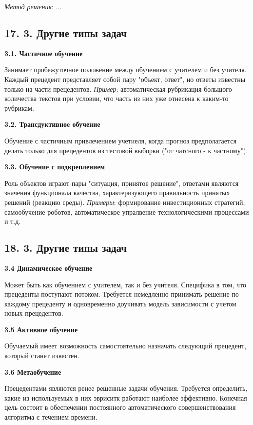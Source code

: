 \textit{Метод решения}: ...

\subsection{17. 3. Другие типы задач}

\textbf{3.1. Частичное обучение}

Занимает пробежуточное положение между обучением с учителем и без учителя.
Каждый прецедент представляет собой пару "объект, ответ", но ответы
известны только на части прецедентов.
\textit{Пример}: автоматическая рубрикация большого количества текстов при условии,
что часть из них уже отнесена к каким-то рубрикам.

\textbf{3.2. Трансдуктивное обучение}

Обучение с частичным привлечением учетиеля, когда прогноз предполагается
делать только для прецедентов из тестовой выборки ("от чатсного - 
к частному").

\textbf{3.3. Обучение с подкреплением}

Роль объектов играют пары "ситуация, принятое решение", ответами являются
значения функционала качества, характеризующего правильность принятых
решений (реакцию среды).
\textit{Примеры}: формирование инвестиционных стратегий, самообучение роботов,
автоматическое упралвение технологическими процессами и т.д.

\subsection{18. 3. Другие типы задач}

\textbf{3.4 Динамическое обучение}

Может быть как обучением с учителем, так и без учителя.
Специфика в том, что прецеденты поступают потоком.
Требуется немедленно принимать решение по каждому прецеденту и одновременно
доучивать модель зависимости с учетом новых прецедентов.

\textbf{3.5 Активное обучение}

Обучаемый имеет возможность самостоятельно назначать следующий прецедент,
который станет известен.

\textbf{3.6 Метаобучение}

Прецедентами являются ренее решенные задачи обучения.
Требуется определить, какие из используемых в них эвриситк работают наиболее
эффективно.
Конечная цель состоит в обеспечении постоянного автоматического
совершенствования алгоритма с течением времени.